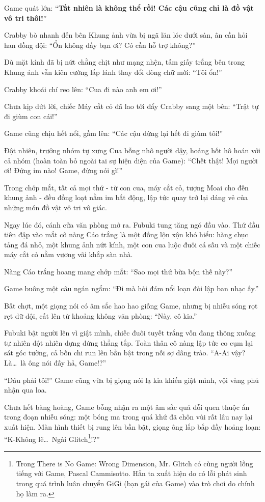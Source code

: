 \documentclass[../main.tex]{subfiles}
\begin{document}
Game quát lớn: ``\textbf{Tất nhiên là không thể rồi! Các cậu cũng chỉ là đồ vật vô tri thôi!}''

Crabby bò nhanh đến bên Khung ảnh vừa bị ngã lăn lóc dưới sàn, ân cần hỏi han đồng đội: ``Ổn không đấy bạn ơi? Có cần hỗ trợ không?''

Dù mặt kính đã bị nứt chằng chịt như mạng nhện, tấm giấy trắng bên trong Khung ảnh vẫn kiên cường lấp lánh thay đổi dòng chữ mới: ``Tôi ổn!''

Crabby khoái chí reo lên: ``Cua đi nào anh em ơi!''

Chưa kịp dứt lời, chiếc Máy cắt cỏ đã lao tới đẩy Crabby sang một bên: ``Trật tự đi giùm con cái!''

Game cũng chịu hết nổi, gầm lên: ``Các cậu dừng lại hết đi giùm tôi!''

Đột nhiên, trưởng nhóm tự xưng Cua bỗng nhô người dậy, hoảng hốt hô hoán với cả nhóm (hoàn toàn bỏ ngoài tai sự hiện diện của Game): ``Chết thật! Mọi người ơi! Đứng im nào! Game, đừng nói gì!''

Trong chớp mắt, tất cả mọi thứ - từ con cua, máy cắt cỏ, tượng Moai cho đến khung ảnh - đều đồng loạt nằm im bất động, lập tức quay trở lại dáng vẻ của những món đồ vật vô tri vô giác.

Ngay lúc đó, cánh cửa văn phòng mở ra. Fubuki tung tăng ngó đầu vào. Thứ đầu tiên đập vào mắt cô nàng Cáo trắng là một đống lộn xộn khó hiểu: hàng chục tảng đá nhỏ, một khung ảnh nứt kính, một con cua luộc đuôi cá sấu và một chiếc máy cắt cỏ nằm vương vãi khắp sàn nhà.


Nàng Cáo trắng hoang mang chớp mắt: ``Sao mọi thứ bừa bộn thế này?''

Game buông một câu ngán ngẩm: ``Đi mà hỏi đám nổi loạn đòi lập ban nhạc ấy.''

Bất chợt, một giọng nói có âm sắc hao hao giống Game, nhưng bị nhiễu sóng rọt rẹt dữ dội, cất lên từ khoảng không văn phòng: ``Này, cô kia.''

Fubuki bật người lên vì giật mình, chiếc đuôi tuyết trắng vốn đang thõng xuống tự nhiên đột nhiên dựng đứng thẳng tắp. Toàn thân cô nàng lập tức co cụm lại sát góc tường, cả bốn chi run lên bần bật trong nỗi sợ dâng trào. ``A-Ai vậy? Là\dots\ là ông nói đấy hả, Game!?''

``Đâu phải tôi!'' Game cũng vừa bị giọng nói lạ kia khiến giật mình, vội vàng phủ nhận qua loa.

Chưa hết bàng hoàng, Game bỗng nhận ra một âm sắc quá đỗi quen thuộc ẩn trong đoạn nhiễu sóng: một bóng ma trong quá khứ đã chôn vùi rất lâu nay lại xuất hiện. Màn hình thiết bị rung lên bần bật, giọng ông lắp bắp đầy hoảng loạn: ``K-Không lẽ\dots\ Ngài Glitch\footnote{Trong There is No Game: Wrong Dimension, Mr. Glitch có cùng người lồng tiếng với Game, Pascal Cammisotto. Hắn ta xuất hiện do có lỗi phát sinh trong quá trình luân chuyển GiGi (bạn gái của Game) vào trò chơi do chính họ làm ra.}!?''
\end{document}
